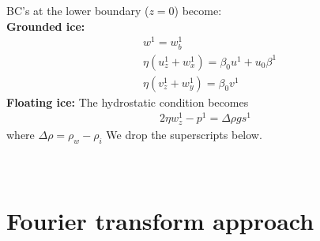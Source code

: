 \documentclass[paper=a4, fontsize=11pt]{article}
\begin{document}
\\ \\
BC's at the lower boundary ($z=0$) become:\\
\textbf{Grounded ice:}
\begin{align}
&w^1  = w_b^1\\
&\eta(u_z^1 + w_x^1) = \beta_0 u^1 + u_0\beta^1 \\
&\eta(v_z^1 +w_y^1) = \beta_0 v^1
\end{align}
\textbf{Floating ice:}
The hydrostatic condition becomes
\begin{align}
2\eta w_z^1 - p^1 = \Delta\rho g s^1
\end{align}
where $\Delta\rho = \rho_w-\rho_i$
We drop the superscripts below. \\ \\
\\ \section*{Fourier transform approach}
\end{document}
